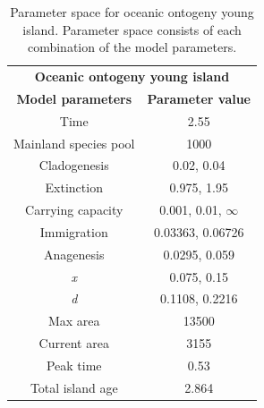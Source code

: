 \begin{table}[h]
    \centering
    \caption{Parameter space for oceanic ontogeny young island. Parameter space consists of each combination of the model parameters.}
    \begin{tabular}{ c | c }
        \multicolumn{2}{c}{\textbf{Oceanic ontogeny young island}} \\
        \textbf{Model parameters} & \textbf{Parameter value} \\ 
        \hline
        \hline
        Time & 2.55 \\
        \hline
        Mainland species pool & 1000 \\
        \hline
        Cladogenesis & 0.02, 0.04 \\
        \hline
        Extinction & 0.975, 1.95 \\
        \hline
        Carrying capacity & 0.001, 0.01, $\infty$ \\
        \hline
        Immigration & 0.03363, 0.06726 \\
        \hline
        Anagenesis & 0.0295, 0.059 \\
        \hline
        \textit{x} & 0.075, 0.15 \\
        \hline
        \textit{d} & 0.1108, 0.2216 \\
        \hline
        Max area & 13500 \\
        \hline
        Current area & 3155 \\
        \hline
        Peak time & 0.53 \\
        \hline
        Total island age & 2.864 \\
    \end{tabular}
    \label{tab:oceanic_ontogeny_young}
\end{table}

